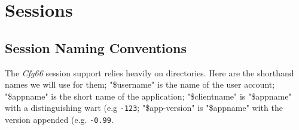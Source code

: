 %
%
%

\section{Sessions}
\label{sec:sessions}

\subsection{Session Naming Conventions}
\label{subsec:session_naming_conventions}

   The \textsl{Cfg66} session support relies heavily on directories.
   Here are the shorthand names we will use for them; "\$username" is the name
   of the user account; "\$appname" is the short name of the application;
   "\$clientname" is "\$appname" with a distinguishing wart (e.g \texttt{-123};
   "\$app-version" is "\$appname" with the version appended
   (e.g. \texttt{-0.99}.

